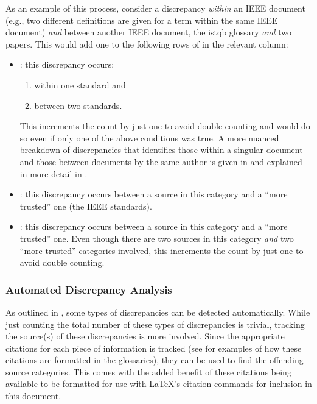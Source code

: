\label{discrep-analysis-example}
As an example of this process, consider a discrepancy \emph{within} an IEEE
document (e.g., two different definitions are given for a term within the same
IEEE document) \emph{and} between another IEEE document, the \acs{istqb}
glossary \emph{and} two papers. This would add one to the following rows of
 in the relevant column:

\begin{itemize}
    \item \textbf{\stds{}}: this discrepancy occurs:
          \begin{enumerate}
              \item within one standard and
              \item between two standards.
          \end{enumerate}
          This increments the count by just one to avoid double counting and
          would do so even if only one of the above conditions was true. A more
          nuanced breakdown of discrepancies that identifies those within a
          singular document and those between documents by the same author is
          given in  and explained in more detail in
          .
    \item \textbf{\metas{}}: this discrepancy occurs between a
          source in this category and a ``more trusted'' one
          (the IEEE standards).
    \item \textbf{\papers{}}: this discrepancy occurs between a
          source in this category and a ``more trusted'' one. Even though there
          are two sources in this category \emph{and} two ``more trusted''
          categories involved, this increments the count by just one to avoid
          double counting.
\end{itemize}

\subsubsection{Automated Discrepancy Analysis}
\label{auto-discrep-analysis}

As outlined in , some types of discrepancies can be detected
automatically. While just counting the total number of these types of
discrepancies is trivial, tracking the source(s) of these discrepancies is more
involved. Since the appropriate citations for each piece of information is
tracked (see  for examples of
how these citations are formatted in the glossaries), they can be used to find
the offending source categories. This comes with the added benefit of these
citations being available to be formatted for use with \LaTeX{}'s citation
commands for inclusion in this document.

